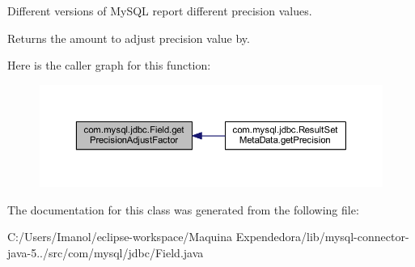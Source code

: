 Different versions of My\+S\+QL report different precision values.

\begin{DoxyReturn}{Returns}
the amount to adjust precision value by. 
\end{DoxyReturn}
Here is the caller graph for this function\+:
\nopagebreak
\begin{figure}[H]
\begin{center}
\leavevmode
\includegraphics[width=350pt]{classcom_1_1mysql_1_1jdbc_1_1_field_a9b3064e50f673507d96842fd16496a0d_icgraph}
\end{center}
\end{figure}


The documentation for this class was generated from the following file\+:\begin{DoxyCompactItemize}
\item 
C\+:/\+Users/\+Imanol/eclipse-\/workspace/\+Maquina Expendedora/lib/mysql-\/connector-\/java-\/5../src/com/mysql/jdbc/Field.\+java\end{DoxyCompactItemize}
